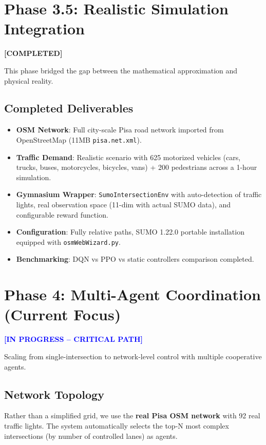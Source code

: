 \documentclass[a4paper,11pt]{article}
\begin{document}
\section{Phase 3.5: Realistic Simulation Integration}
\textcolor{green!60!black}{\textbf{[COMPLETED]}}

This phase bridged the gap between the mathematical approximation and physical reality.

\subsection{Completed Deliverables}
\begin{itemize}
    \item \textbf{OSM Network}: Full city-scale Pisa road network imported from OpenStreetMap (11MB \texttt{pisa.net.xml}).
    \item \textbf{Traffic Demand}: Realistic scenario with 625 motorized vehicles (cars, trucks, buses, motorcycles, bicycles, vans) + 200 pedestrians across a 1-hour simulation.
    \item \textbf{Gymnasium Wrapper}: \texttt{SumoIntersectionEnv} with auto-detection of traffic lights, real observation space (11-dim with actual SUMO data), and configurable reward function.
    \item \textbf{Configuration}: Fully relative paths, SUMO 1.22.0 portable installation equipped with \texttt{osmWebWizard.py}.
    \item \textbf{Benchmarking}: DQN vs PPO vs static controllers comparison completed.
\end{itemize}

\section{Phase 4: Multi-Agent Coordination (Current Focus)}
\textcolor{blue}{\textbf{[IN PROGRESS -- CRITICAL PATH]}}

Scaling from single-intersection to network-level control with multiple cooperative agents.

\subsection{Network Topology}
Rather than a simplified grid, we use the \textbf{real Pisa OSM network} with 92 real traffic lights. The system automatically selects the top-N most complex intersections (by number of controlled lanes) as agents.
\end{document}
